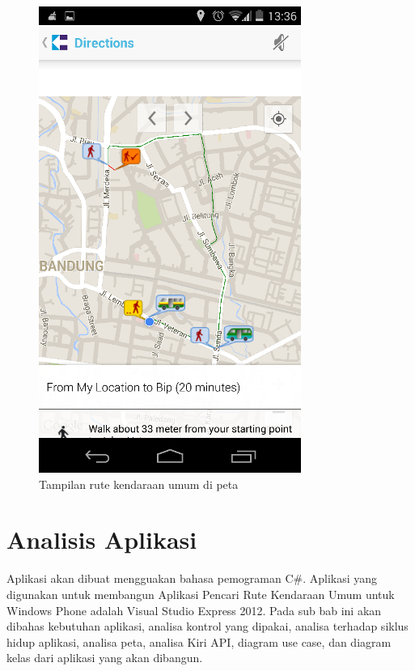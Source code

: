 \begin{figure}[h]
	\centering
		\includegraphics[scale=0.5]{Gambar/KIRI_Android/tampilan_peta}
	\caption{Tampilan rute kendaraan umum di peta}
	\label{fig:peta}
\end{figure}

\clearpage

\section{Analisis Aplikasi}
\label{lab:Analisis Aplikasi}
\hspace{0.5cm} Aplikasi akan dibuat mengguakan bahasa pemograman C\#. Aplikasi yang digunakan untuk membangun Aplikasi Pencari Rute Kendaraan Umum untuk Windows Phone adalah Visual Studio Express 2012. Pada sub bab ini akan dibahas kebutuhan aplikasi, analisa kontrol yang dipakai, analisa terhadap siklus hidup aplikasi, analisa peta, analisa Kiri API, diagram use case, dan diagram kelas dari aplikasi yang akan dibangun. 

